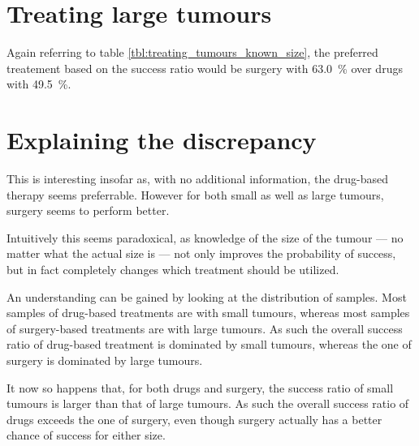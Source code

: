 \documentclass[a4paper]{scrreprt}
\begin{document}
\section{Treating large tumours}

Again referring to table \ref{tbl:treating_tumours_known_size}, the preferred
treatement based on the success ratio would be surgery with \SI{63.0}{\percent}
over drugs with \SI{49.5}{\percent}.

\section{Explaining the discrepancy}

This is interesting insofar as, with no additional information, the drug-based
therapy seems preferrable. However for both small as well as large tumours,
surgery seems to perform better.

Intuitively this seems paradoxical, as knowledge of the size of the tumour ---
no matter what the actual size is --- not only improves the probability of
success, but in fact completely changes which treatment should be utilized.

An understanding can be gained by looking at the distribution of samples. Most
samples of drug-based treatments are with small tumours, whereas most samples
of surgery-based treatments are with large tumours. As such the overall success
ratio of drug-based treatment is dominated by small tumours, whereas the one of
surgery is dominated by large tumours.

It now so happens that, for both drugs and surgery, the success ratio of small
tumours is larger than that of large tumours. As such the overall success ratio
of drugs exceeds the one of surgery, even though surgery actually has a better
chance of success for either size.
\end{document}
